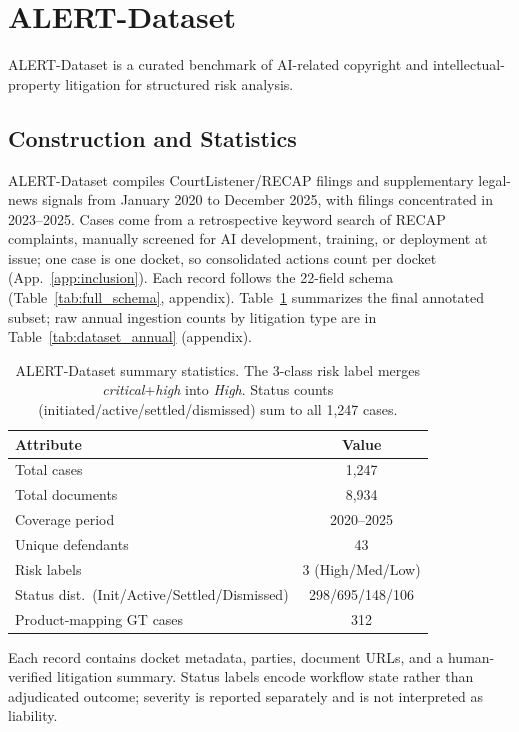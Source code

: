 \section{ALERT-Dataset}
\label{sec:dataset}
ALERT-Dataset is a curated benchmark of AI-related copyright and intellectual-property litigation for structured risk analysis.

\subsection{Construction and Statistics}
ALERT-Dataset compiles CourtListener/RECAP filings and supplementary legal-news signals from January 2020 to December 2025, with filings concentrated in 2023--2025. Cases come from a retrospective keyword search of RECAP complaints, manually screened for AI development, training, or deployment at issue; one case is one docket, so consolidated actions count per docket (App.~\ref{app:inclusion}). Each record follows the 22-field \schemafile{} schema (Table~\ref{tab:full_schema}, appendix). Table~\ref{tab:dataset_stats} summarizes the final annotated subset; raw annual ingestion counts by litigation type are in Table~\ref{tab:dataset_annual} (appendix).

\begin{table}[t]
\centering
\caption{ALERT-Dataset summary statistics. The 3-class risk label merges \emph{critical}+\emph{high} into \emph{High}. Status counts (initiated/active/settled/dismissed) sum to all 1,247 cases.}
\label{tab:dataset_stats}
\footnotesize
\setlength{\tabcolsep}{6pt}
\begin{tabular}{p{4.2cm} c}
\toprule
\textbf{Attribute} & \textbf{Value} \\
\midrule
Total cases & 1,247 \\
Total documents & 8,934 \\
Coverage period & 2020--2025 \\
Unique defendants & 43 \\
Risk labels & 3 (High/Med/Low) \\
Status dist.\ (Init/Active/Settled/Dismissed) & 298/695/148/106 \\
Product-mapping GT cases & 312 \\
\bottomrule
\end{tabular}
\end{table}

Each record contains docket metadata, parties, document URLs, and a human-verified litigation summary. Status labels encode workflow state rather than adjudicated outcome; severity is reported separately and is not interpreted as liability.

